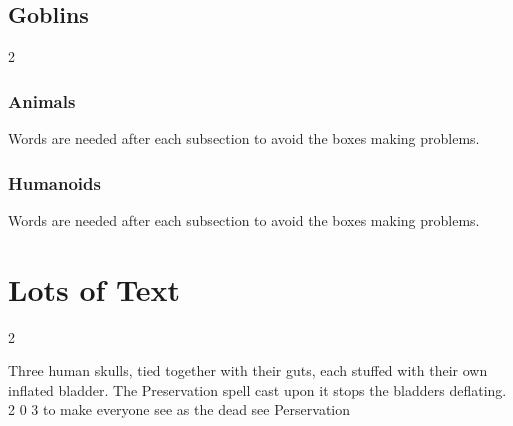 \documentclass[a4paper,openany]{book}
\begin{document}
\section{Goblins}

\begin{multicols}{2}

\subsection{Animals}
Words are needed after each subsection to avoid the boxes making problems.

\morphhorse

\morphcat

\morphslug

\morphspider

\morphwolf

\subsection{Humanoids}
Words are needed after each subsection to avoid the boxes making problems.



\goblin

\goblincaster

\hobgoblin

\ogre

\end{multicols}


\chapter{Lots of Text}

\begin{multicols}{2}

\noindent
\lipsum

  {Three human skulls, tied together with their guts, each stuffed with their own inflated bladder.
  The Preservation spell cast upon it stops the bladders deflating.}%
  {2}%
  {0}%
  {3}%
  {to make everyone see as the dead see}%
  {Perservation}%
  {
    \setcounter{Vigilance}{1}
    \setcounter{Fate}{2}
    \setcounter{Air}{2}
    \setcounter{Water}{1}
  }%

\end{multicols}
\end{document}
